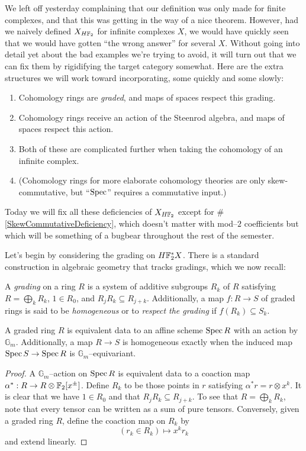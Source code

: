 We left off yesterday complaining that our definition was only made for finite complexes, and that this was getting in the way of a nice theorem.  However, had we naively defined $X_{H\mathbb F_2}$ for infinite complexes $X$, we would have quickly seen that we would have gotten ``the wrong answer'' for several $X$.  Without going into detail yet about the bad examples we're trying to avoid, it will turn out that we can fix them by rigidifying the target category somewhat.  Here are the extra structures we will work toward incorporating, some quickly and some slowly:
\begin{enumerate}
\item Cohomology rings are \emph{graded}, and maps of spaces respect this grading.
\item Cohomology rings receive an action of the Steenrod algebra, and maps of spaces respect this action.
\item Both of these are complicated further when taking the cohomology of an infinite complex.
\item \label{SkewCommutativeDeficiency} (Cohomology rings for more elaborate cohomology theories are only skew-commutative, but ``$\operatorname{Spec}$'' requires a commutative input.)
\end{enumerate}
Today we will fix all these deficiencies of $X_{H\mathbb F_2}$ except for \#\ref{SkewCommutativeDeficiency}, which doesn't matter with mod--$2$ coefficients but which will be something of a bugbear throughout the rest of the semester.

Let's begin by considering the grading on $H\mathbb F_2^* X$.  There is a standard construction in algebraic geometry that tracks gradings, which we now recall:

\begin{definition}
A \textit{grading} on a ring $R$ is a system of additive subgroups $R_k$ of $R$ satisfying $R = \bigoplus_k R_k$, $1 \in R_0$, and $R_j R_k \subseteq R_{j+k}$.  Additionally, a map $f: R \to S$ of graded rings is said to be \textit{homogeneous} or to \textit{respect the grading} if $f(R_k) \subseteq S_k$.
\end{definition}

\begin{lemma}\label{GradedAndGmEquivAgree}
A graded ring $R$ is equivalent data to an affine scheme $\operatorname{Spec} R$ with an action by $\mathbb G_m$.  Additionally, a map $R \to S$ is homogeneous exactly when the induced map $\operatorname{Spec} S \to \operatorname{Spec} R$ is $\mathbb G_m$--equivariant.
\end{lemma}
\begin{proof}
A $\mathbb G_m$--action on $\operatorname{Spec} R$ is equivalent data to a coaction map $\alpha^*: R \to R \otimes \mathbb F_2[x^\pm]$.  Define $R_k$ to be those points in $r$ satisfying $\alpha^* r = r \otimes x^k$.  It is clear that we have $1 \in R_0$ and that $R_j R_k \subseteq R_{j+k}$.  To see that $R = \bigoplus_k R_k$, note that every tensor can be written as a sum of pure tensors.  Conversely, given a graded ring $R$, define the coaction map on $R_k$ by \[(r_k \in R_k) \mapsto x^k r_k\] and extend linearly.
\end{proof}

